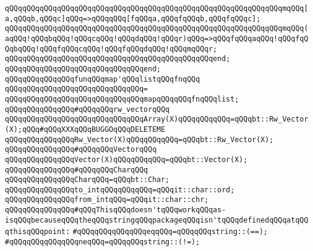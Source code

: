 \verb|qQQqqQQqqQQqqQQqqQQqqQQqqQQqqQQqqQQqqQQqqQQqqQQqqQQqqQQqqQQqqQQqmqQQq[a,qQQqb,qQQqc]qQQq=>qQQqqQQq[fqQQqa,qQQqfqQQqb,qQQqfqQQqc];|\newline
\verb|qQQqqQQqqQQqqQQqqQQqqQQqqQQqqQQqqQQqqQQqqQQqqQQqqQQqqQQqqQQqqQQqmqQQq(aqQQq!qQQqbqQQq!qQQqcqQQq!qQQqdqQQq!qQQqr)qQQq=>qQQqfqQQqaqQQq!qQQqfqQQqbqQQq!qQQqfqQQqcqQQq!qQQqfqQQqdqQQq!qQQqmqQQqr;|\newline
\verb|qQQqqQQqqQQqqQQqqQQqqQQqqQQqqQQqqQQqqQQqqQQqqQQqend;|\newline
\verb|qQQqqQQqqQQqqQQqqQQqqQQqqQQqqQQqend;|\newline
\newline
\newline
\verb|qQQqqQQqqQQqqQQqfunqQQqmap'qQQqlistqQQqfnqQQq|\newline
\verb|qQQqqQQqqQQqqQQqqQQqqQQqqQQqqQQq=|\newline
\verb|qQQqqQQqqQQqqQQqqQQqqQQqqQQqqQQqmapqQQqqQQqfnqQQqlist;|\newline
\newline
\newline
\verb|qQQqqQQqqQQqqQQq#qQQqqQQqrw_vectorqQQq|\newline
\verb|qQQqqQQqqQQqqQQqqQQqqQQqqQQqqQQqArray(X)qQQqqQQqqQQq=qQQqbt::Rw_Vector(X);qQQq#qQQqXXXqQQqBUGGOqQQqDELETEME|\newline
\verb|qQQqqQQqqQQqqQQqRw_Vector(X)qQQqqQQqqQQq=qQQqbt::Rw_Vector(X);|\newline
\newline
\verb|qQQqqQQqqQQqqQQq#qQQqqQQqVectorqQQq|\newline
\verb|qQQqqQQqqQQqqQQqVector(X)qQQqqQQqqQQq=qQQqbt::Vector(X);|\newline
\newline
\verb|qQQqqQQqqQQqqQQq#qQQqqQQqCharqQQq|\newline
\verb|qQQqqQQqqQQqqQQqCharqQQq=qQQqbt::Char;|\newline
\newline
\verb|qQQqqQQqqQQqqQQqto_intqQQqqQQqqQQq=qQQqit::char::ord;|\newline
\verb|qQQqqQQqqQQqqQQqfrom_intqQQq=qQQqit::char::chr;|\newline
\newline
\verb|qQQqqQQqqQQqqQQq#qQQqThisqQQqdoesn'tqQQqworkqQQqas-isqQQqbecauseqQQqtheqQQqstringqQQqpackageqQQqisn'tqQQqdefinedqQQqatqQQqthisqQQqpoint:|\newline
\verb|#qQQqqQQqqQQqqQQqeqqQQq=qQQqqQQqstring::(==);|\newline
\verb|#qQQqqQQqqQQqqQQqneqQQq=qQQqqQQqstring::(!=);|\newline
